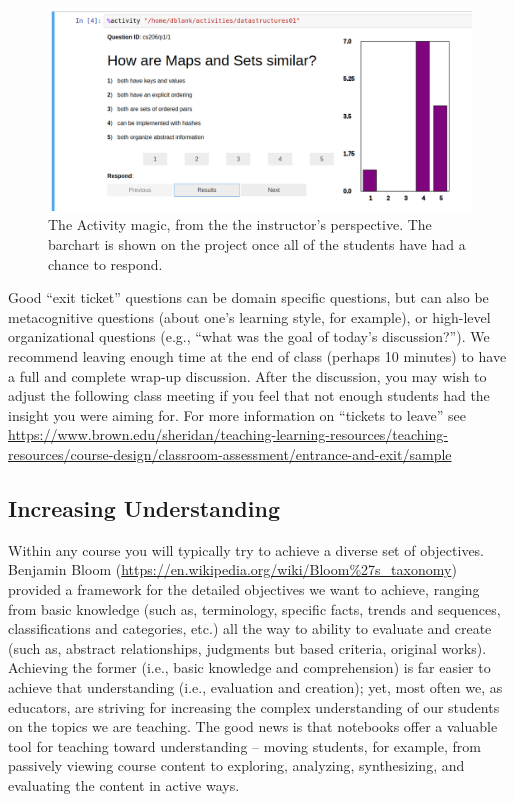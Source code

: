 \documentclass[]{book}
\begin{document}
\begin{figure}
\centering
\includegraphics{images/activity-magic-instructor.png}
\caption{The Activity magic, from the the instructor's perspective. The
barchart is shown on the project once all of the students have had a
chance to respond.}
\end{figure}

Good ``exit ticket'' questions can be domain specific questions, but can
also be metacognitive questions (about one's learning style, for
example), or high-level organizational questions (e.g., ``what was the
goal of today's discussion?''). We recommend leaving enough time at the
end of class (perhaps 10 minutes) to have a full and complete wrap-up
discussion. After the discussion, you may wish to adjust the following
class meeting if you feel that not enough students had the insight you
were aiming for. For more information on ``tickets to leave'' see
\url{https://www.brown.edu/sheridan/teaching-learning-resources/teaching-resources/course-design/classroom-assessment/entrance-and-exit/sample}

\subsection{Increasing Understanding}\label{increasing-understanding}

Within any course you will typically try to achieve a diverse set of
objectives. Benjamin Bloom
(\url{https://en.wikipedia.org/wiki/Bloom\%27s_taxonomy}) provided a
framework for the detailed objectives we want to achieve, ranging from
basic knowledge (such as, terminology, specific facts, trends and
sequences, classifications and categories, etc.) all the way to ability
to evaluate and create (such as, abstract relationships, judgments but
based criteria, original works). Achieving the former (i.e., basic
knowledge and comprehension) is far easier to achieve that understanding
(i.e., evaluation and creation); yet, most often we, as educators, are
striving for increasing the complex understanding of our students on the
topics we are teaching. The good news is that notebooks offer a valuable
tool for teaching toward understanding -- moving students, for example,
from passively viewing course content to exploring, analyzing,
synthesizing, and evaluating the content in active ways.
\end{document}
